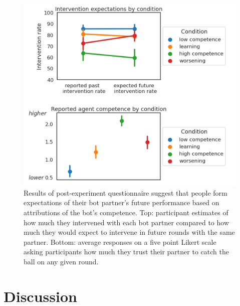 \documentclass[10pt,letterpaper]{article}
\begin{document}
\begin{figure}[H]
\begin{center}
\includegraphics[width=\linewidth]{img/results-survey.png}
\end{center}
\caption{Results of post-experiment questionnaire suggest that people form expectations of their bot partner's future performance based on attributions of the bot's competence. Top: participant estimates of how much they intervened with each bot partner compared to how much they would expect to intervene in future rounds with the same partner. Bottom: average responses on a five point Likert scale asking participants how much they trust their partner to catch the ball on any given round.} 
\label{fig:survey}
\end{figure}



\section{Discussion}









\setlength{\bibleftmargin}{.125in}
\setlength{\bibindent}{-\bibleftmargin}
\typeout{} %

\end{document}

